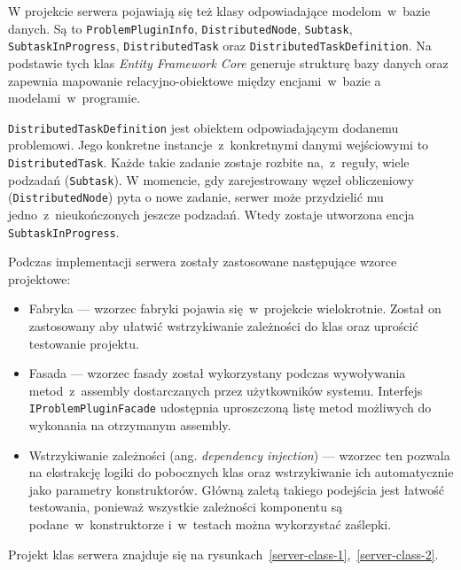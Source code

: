 \documentclass[a4paper,11pt,twoside]{report}
\theoremstyle{definition}
\begin{document}
W projekcie serwera pojawiają się też klasy odpowiadające modelom~w~bazie danych.
Są to \texttt{ProblemPluginInfo}, \texttt{DistributedNode}, \texttt{Subtask}, \texttt{SubtaskInProgress}, \texttt{DistributedTask} oraz \texttt{DistributedTaskDefinition}.
Na podstawie tych klas \textit{Entity Framework Core} generuje strukturę bazy danych oraz zapewnia mapowanie relacyjno-obiektowe między encjami~w~bazie a modelami~w~programie.

\texttt{DistributedTaskDefinition} jest obiektem odpowiadającym dodanemu problemowi.
Jego konkretne instancje~z~konkretnymi danymi wejściowymi to \texttt{DistributedTask}.
Każde takie zadanie zostaje rozbite na,~z~reguły, wiele podzadań (\texttt{Subtask}).
W momencie, gdy zarejestrowany węzeł obliczeniowy (\texttt{DistributedNode}) pyta o nowe zadanie, serwer może przydzielić mu jedno~z~nieukończonych jeszcze podzadań.
Wtedy zostaje utworzona encja \texttt{SubtaskInProgress}.


Podczas implementacji serwera zostały zastosowane następujące wzorce projektowe:
\begin{itemize}
    \item Fabryka --- wzorzec fabryki pojawia się~w~projekcie wielokrotnie. Został on zastosowany aby ułatwić wstrzykiwanie zależności do klas oraz uprościć testowanie projektu.
    \item Fasada --- wzorzec fasady został wykorzystany podczas wywoływania metod~z~assembly dostarczanych przez użytkowników systemu. Interfejs \texttt{IProblemPluginFacade} udostępnia  uproszczoną listę metod możliwych do wykonania na otrzymanym assembly.
    \item Wstrzykiwanie zależności (ang. \textit{dependency injection}) --- wzorzec ten pozwala na ekstrakcję logiki do pobocznych klas oraz wstrzykiwanie ich automatycznie jako parametry konstruktorów. Główną zaletą takiego podejścia jest łatwość testowania, ponieważ wszystkie zależności komponentu są podane~w~konstruktorze i~w~testach można wykorzystać zaślepki.
\end{itemize}

Projekt klas serwera znajduje się na rysunkach~\ref{server-class-1},~\ref{server-class-2}.
\end{document}
